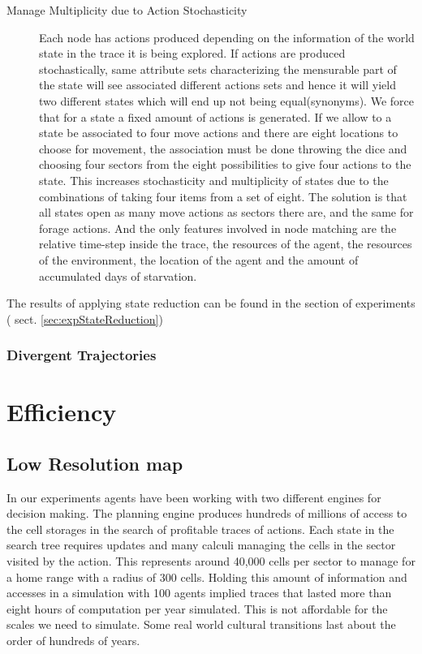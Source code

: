 \documentclass[11pt,oneside,a4paper,openright]{report}
\begin{document}
\begin{description}
\item [Manage Multiplicity due to Action Stochasticity] 
    Each node has actions produced depending on the information of the world state in the trace it is
    being explored. If actions are produced stochastically, same attribute sets characterizing the mensurable
    part of the state will see associated different actions sets and hence it will yield two different
    states which will end up not being equal(synonyms). We force that for a state a fixed amount of actions 
    is generated. If we allow to a state be associated to four move actions and there are eight locations
    to choose for movement, the association must be done throwing the dice and choosing four sectors
    from the eight possibilities to give four actions to the state. This increases stochasticity and
    multiplicity of states due to the combinations of taking four items from a set of eight. The solution is
    that all states open as many move actions as sectors there are, and the same for forage actions.
    And the only features involved in node matching are the relative time-step inside the trace, the resources
    of the agent, the resources of the environment, the location of the agent and the amount of accumulated days of starvation.
    
\end{description}
    
The results of applying state reduction can be found in the section of experiments ( sect. \ref{sec:expStateReduction})



\subsubsection{Divergent Trajectories}
\label{sec:Divergence}











\section{Efficiency}

\subsection{Low Resolution map}

In our experiments agents have been working with two different engines for decision making. The planning engine produces hundreds of millions of access to the cell storages in the search of profitable traces of actions. Each state in the search tree requires updates and many calculi managing the cells in the sector visited by the action. 
This represents around 40,000 cells per sector to manage for a home range with a radius of 300 cells. Holding this amount of information and accesses in a simulation with 100 agents implied traces that lasted more than eight hours of computation per year simulated. This is not affordable for the scales we need to simulate. Some real world cultural transitions last about the order of hundreds of years. 
\end{document}
